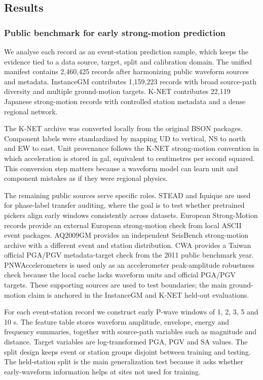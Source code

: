\documentclass[
  10pt,
]{article}
\begin{document}
\subsection{Results}\label{results}

\subsubsection{Public benchmark for early strong-motion
prediction}\label{public-benchmark-for-early-strong-motion-prediction}

We analyse each record as an event-station prediction sample, which
keeps the evidence tied to a data source, target, split and calibration
domain. The unified manifest contains 2,460,425 records after
harmonizing public waveform sources and metadata. InstanceGM contributes
1,159,223 records with broad source-path diversity and multiple
ground-motion targets. K-NET contributes 22,119 Japanese strong-motion
records with controlled station metadata and a dense regional network.

The K-NET archive was converted locally from the original BSON packages.
Component labels were standardized by mapping UD to vertical, NS to
north and EW to east. Unit provenance follows the K-NET strong-motion
convention in which acceleration is stored in gal, equivalent to
centimetres per second squared. This conversion step matters because a
waveform model can learn unit and component mistakes as if they were
regional physics.

The remaining public sources serve specific roles. STEAD and Iquique are
used for phase-label transfer auditing, where the goal is to test
whether pretrained pickers align early windows consistently across
datasets. European Strong-Motion records provide an external European
strong-motion check from local ASCII event packages. AQ2009GM provides
an independent SeisBench strong-motion archive with a different event
and station distribution. CWA provides a Taiwan official PGA/PGV
metadata-target check from the 2011 public benchmark year.
PNWAccelerometers is used only as an accelerometer peak-amplitude
robustness check because the local cache lacks waveform units and
official PGA/PGV targets. These supporting sources are used to test
boundaries; the main ground-motion claim is anchored in the InstanceGM
and K-NET held-out evaluations.

For each event-station record we construct early P-wave windows of 1, 2,
3, 5 and 10 s. The feature table stores waveform amplitude, envelope,
energy and frequency summaries, together with source-path variables such
as magnitude and distance. Target variables are log-transformed PGA, PGV
and SA values. The split design keeps event or station groups disjoint
between training and testing. The held-station split is the main
generalization test because it asks whether early-waveform information
helps at sites not used for training.
\end{document}
